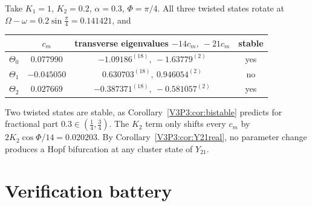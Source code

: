Take $K_1=1$, $K_2=0.2$, $\alpha=0.3$, $\Phi=\pi/4$. All three twisted states rotate at
$\Omega-\omega=0.2\sin\frac\pi4=0.141421$, and
\begin{center}
\begin{tabular}{lccc}
\toprule
& $c_m$ & transverse eigenvalues $-14c_m,\ -21c_m$ & stable\\
\midrule
$\Theta_0$ & $0.077990$ & $-1.09186^{(18)},\ -1.63779^{(2)}$ & yes\\
$\Theta_1$ & $-0.045050$ & $0.630703^{(18)},\ 0.946054^{(2)}$ & no\\
$\Theta_2$ & $0.027669$ & $-0.387371^{(18)},\ -0.581057^{(2)}$ & yes\\
\bottomrule
\end{tabular}
\end{center}
Two twisted states are stable, as Corollary~\ref{V3P3:cor:bistable} predicts for
fractional part $0.3\in(\frac14,\frac34)$. The $K_2$ term only shifts every $c_m$ by
$2K_2\cos\Phi/14=0.020203$. By Corollary~\ref{V3P3:cor:Y21real}, no parameter change produces a
Hopf bifurcation at any cluster state of $Y_{21}$.



\section{Verification battery}\label{V3P3:sec:battery}

